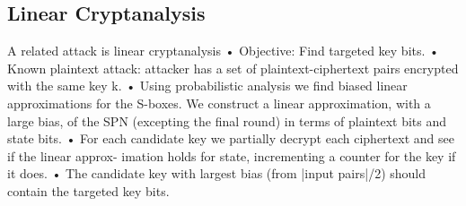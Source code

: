 \subsection{Linear Cryptanalysis}
A related attack is linear cryptanalysis
• Objective: Find targeted key bits.
• Known plaintext attack: attacker has a set of plaintext-ciphertext pairs encrypted with
the same key k.
• Using probabilistic analysis we find biased linear approximations for the S-boxes. We construct a linear approximation, with a large bias, of the SPN (excepting the final round) in terms of plaintext bits and state bits.
• For each candidate key we partially decrypt each ciphertext and see if the linear approx- imation holds for state, incrementing a counter for the key if it does.
• The candidate key with largest bias (from |input pairs|/2) should contain the targeted key bits.
